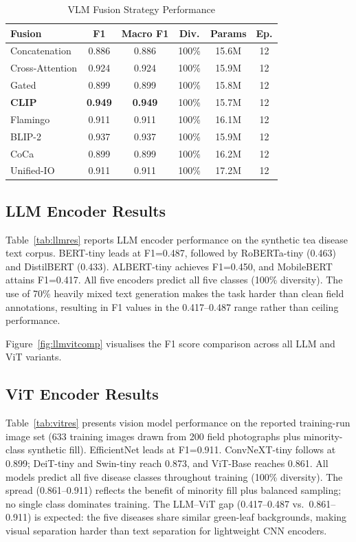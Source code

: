 \documentclass[12pt, a4paper, oneside]{Thesis}
\begin{document}
\begin{table}[t]
\caption{VLM Fusion Strategy Performance}
\label{tab:vlmres}
\centering\footnotesize
\begin{tabular}{lccccc}
\toprule
\textbf{Fusion} & \textbf{F1} & \textbf{Macro F1} & \textbf{Div.} & \textbf{Params} & \textbf{Ep.}\\
\midrule
Concatenation  & 0.886 & 0.886 & 100\% & 15.6M & 12 \\
Cross-Attention & 0.924 & 0.924 & 100\% & 15.9M & 12 \\
Gated           & 0.899 & 0.899 & 100\% & 15.8M & 12 \\
\textbf{CLIP}   & \textbf{0.949} & \textbf{0.949} & 100\% & 15.7M & 12 \\
Flamingo        & 0.911 & 0.911 & 100\% & 16.1M & 12 \\
BLIP-2          & 0.937 & 0.937 & 100\% & 15.9M & 12 \\
CoCa            & 0.899 & 0.899 & 100\% & 16.2M & 12 \\
Unified-IO      & 0.911 & 0.911 & 100\% & 17.2M & 12 \\
\bottomrule
\end{tabular}
\end{table}

\subsection{LLM Encoder Results}

Table~\ref{tab:llmres} reports LLM encoder performance on the synthetic tea disease
text corpus. BERT-tiny leads at F1=0.487, followed by
RoBERTa-tiny (0.463) and DistilBERT (0.433). ALBERT-tiny achieves F1=0.450, and MobileBERT attains
F1=0.417. All five encoders predict all five classes (100\% diversity). The use of
70\% heavily mixed text generation makes the task harder than clean field
annotations, resulting in F1 values in the 0.417--0.487 range rather than ceiling
performance.



Figure~\ref{fig:llmvitcomp} visualises the F1 score comparison across all LLM and ViT variants.

\subsection{ViT Encoder Results}

Table~\ref{tab:vitres} presents vision model performance on the reported
training-run image set (633 training images drawn from 200 field photographs plus
minority-class synthetic fill).
EfficientNet leads at F1=0.911.
ConvNeXT-tiny follows at 0.899; DeiT-tiny and Swin-tiny reach 0.873, and
ViT-Base reaches 0.861. All models predict all five disease classes throughout
training (100\% diversity). The spread (0.861--0.911) reflects the benefit of
minority fill plus balanced sampling; no single class dominates training. The LLM--ViT
gap (0.417--0.487 vs.\ 0.861--0.911) is expected: the five diseases share similar green-leaf
backgrounds, making visual separation harder than text separation for
lightweight CNN encoders.
\end{document}
